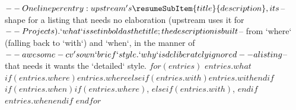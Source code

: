 $-- One line per entry: upstream's \resumeSubItem{title}{description}, its
$-- shape for a listing that needs no elaboration (upstream uses it for
$-- Projects). `what` is set in bold as the title; the description is built
$-- from `where` (falling back to `with`) and `when`, in the manner of
$-- awesome-cv's own `brief` style. `why` is deliberately ignored -- a listing
$-- that needs it wants the `detailed` style.
\resumeSubHeadingListStart
$for(entries)$
  \resumeSubItem
    {$entries.what$} %
    {$if(entries.where)$$entries.where$$elseif(entries.with)$$entries.with$$endif$$if(entries.when)$$if(entries.where)$, $elseif(entries.with)$, $endif$$entries.when$$endif$} %
$endfor$
\resumeSubHeadingListEnd

